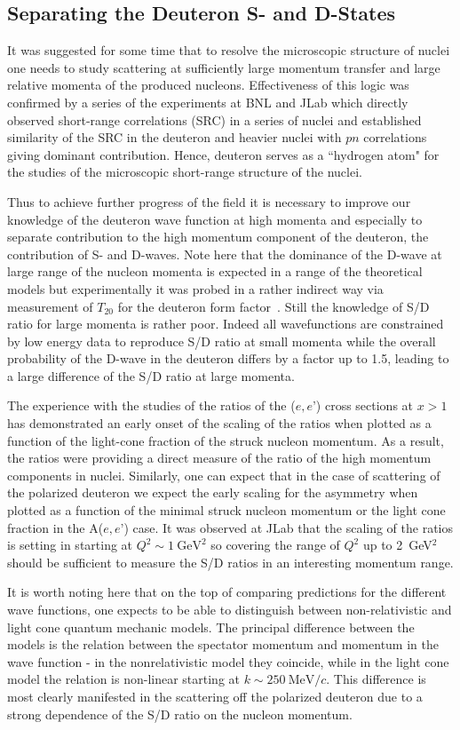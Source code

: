 \subsection{Separating the Deuteron S- and D-States}

It was suggested for some time that to resolve the microscopic structure  of nuclei one needs to study scattering at sufficiently large momentum transfer and large relative momenta of the produced nucleons. Effectiveness of this logic was confirmed by a series of the experiments at BNL and JLab which directly observed  short-range correlations (SRC) in a series of nuclei and established similarity of the SRC in the deuteron and heavier nuclei with $pn$ correlations giving dominant contribution.  Hence, deuteron serves as a ``hydrogen atom" for the studies of the microscopic short-range structure  of the nuclei.

Thus to achieve further progress of the field it is necessary to improve our knowledge of the deuteron wave function at high momenta and especially to separate contribution to the high momentum component of the deuteron, the contribution of S- and D-waves. Note here that the dominance of the D-wave at large range of the nucleon momenta is expected in a range of the theoretical models but experimentally it was probed in a rather indirect way via measurement of $T_{20}$ for the deuteron form factor~\cite{Garcon:2001sz}. Still the knowledge of S/D ratio for large momenta is rather poor. Indeed all wavefunctions are constrained by low energy data to reproduce S/D ratio at small momenta while the overall probability of the D-wave in the deuteron differs by a factor up to 1.5, leading to a large difference of the S/D ratio at large momenta.

The experience with the studies of the ratios of the ($e,e’$) cross sections at $x>1$ has demonstrated an early onset of the scaling of the ratios when plotted as a function of the light-cone fraction of the struck nucleon momentum.  As a result, the ratios were providing a direct measure of the ratio of the high momentum components in nuclei.  Similarly, one can expect that in the case of scattering of the polarized deuteron we expect the early scaling for the asymmetry when plotted as a function of the minimal struck nucleon momentum or the light cone fraction in the A($e,e’$) case.
It was observed at JLab that the scaling of the ratios is setting in starting at $Q^2 \sim 1 \mathrm{~GeV}^2$ so covering the range of $Q^2$ up to 2~GeV$^2$ should be sufficient to  measure the S/D ratios in an interesting momentum range.

It is worth noting here that on the top of comparing predictions for the different wave functions, one expects to be able to distinguish between non-relativistic and light cone quantum mechanic models.  The principal difference between the models is the relation between the spectator momentum and momentum in the wave function - in the nonrelativistic model they coincide, while in the light cone model the relation is non-linear starting at $k \sim 250 \mathrm{~MeV}/c$. This difference is most clearly manifested in the scattering off the polarized deuteron due to a strong dependence of the S/D ratio on the nucleon momentum.